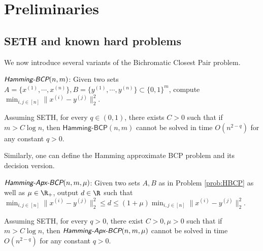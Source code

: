 \section{Preliminaries}






























\subsection{SETH and known hard problems}
\label{sec:hardproblems}





















We now introduce several variants of the Bichromatic Closest Pair problem. 
\begin{problem}
\label{prob:HBCP}
$\emph{\textsf{Hamming-BCP}}(n, m)$: Given two sets $A = \{x^{(1)}, \cdots, x^{(n)}\}, B = \{y^{(1)}, \cdots, y^{(n)}\} \subset \{0, 1\}^m$, compute $\min_{i, j \in [n]} \|x^{(i)} - y^{(j)}\|_2^2$.
\end{problem}
\begin{theorem}[\cite{AW15}]
Assuming SETH, for every $q \in (0, 1)$, there exists $C > 0$ such that if $m > C\log n$, then $\mathsf{Hamming}$-$\mathsf{BCP}(n, m)$ cannot be solved in time $O(n^{2-q})$ for any constant $q>0$.
\end{theorem}

Similarly, one can define the Hamming approximate BCP problem and its decision version.
\begin{problem}
\label{prob:HABCP}
$\emph{\textsf{Hamming-Apx-BCP}}(n, m, \mu)$:
Given two sets $A, B$ as in Problem \ref{prob:HBCP} as well as $\mu \in \R_+$, output $d \in \R$ such that $\min_{i, j \in [n]} \|x^{(i)} - y^{(j)}\|_2^2 \le d \le (1 + \mu) \min_{i, j \in [n]} \|x^{(i)} - y^{(j)}\|_2^2$.
\end{problem}
\begin{theorem} \label{bcp1}
Assuming SETH, for every $q > 0$, there exist $C > 0, \mu > 0$ such that if $m > C\log n$, then $\emph{\textsf{Hamming-Apx-BCP}}(n, m, \mu)$ cannot be solved in time $O(n^{2-q})$ for any constant $q>0$.
\end{theorem}

